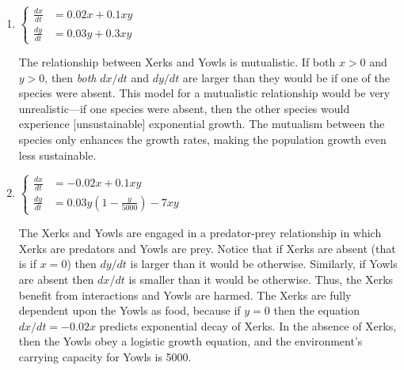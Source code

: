 \documentclass[main]{subfiles}
\begin{document}
\begin{enumerate}
\begin{enumerate}
   \begin{solution}
     As in Part (a), the Xerks and the Yowls are in competition, as can be seen by 
     considering what happens if precisely one of the species is absent.  This time,
     if one species is absent, then the other species experiences logistic growth.
     In the absence of Yowls, the environment has a carrying capacity of 300 Xerks.
     In the absence of Xerks, the environment has a carrying capacity of 60 Yowls.
   \end{solution}

\item 
   \begin{problem}[0.1in]   
    $\left\{\begin{aligned}
      \frac{dx}{dt} & = 0.02x  + 0.1xy \\
      \frac{dy}{dt} & = 0.03y +  0.3xy
    \end{aligned}\right.$
   \end{problem}

   \begin{solution}
     The relationship between Xerks and Yowls is mutualistic.  If both
     $x > 0$ and $y > 0$, then {\em both} $dx/dt$ and $dy/dt$ are larger
     than they would be if one of the species were absent.  This model for
     a mutualistic relationship would be very unrealistic---if one species
     were absent, then the other species would experience [unsustainable]
     exponential growth.  The mutualism between the species only enhances
     the growth rates, making the population growth even less sustainable.
   \end{solution}


\item 
   \begin{problem}[0.1in]   
    $\left\{\begin{aligned}
      \frac{dx}{dt} & = -0.02x + 0.1xy \\
      \frac{dy}{dt} & = 0.03y \left( 1 - \frac{y}{5000} \right) -  7xy
    \end{aligned}\right.$
   \end{problem}

   \begin{solution}
      The Xerks and Yowls are engaged in a predator-prey relationship in
      which Xerks are predators and Yowls are prey.  Notice that if Xerks
      are absent (that is if $x = 0$) then $dy/dt$ is larger than it would
      be otherwise.  Similarly, if Yowls are absent then $dx/dt$ is smaller
      than it would be otherwise.  Thus, the Xerks benefit from interactions
      and Yowls are harmed.  The Xerks are fully dependent upon the Yowls
      as food, because if $y = 0$ then the equation $dx/dt = -0.02x$
      predicts exponential decay of Xerks.  In the absence of Xerks, then
      the Yowls obey a logistic growth equation, and the environment's
      carrying capacity for Yowls is 5000.
   \end{solution}


\end{enumerate}
\end{enumerate}
\end{document}
